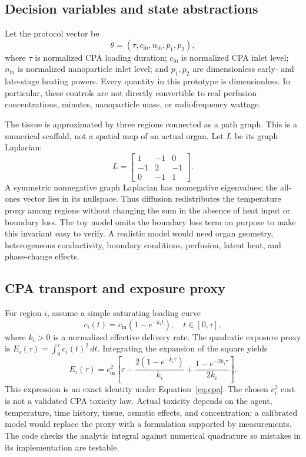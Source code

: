 \documentclass[11pt]{article}
\begin{document}
\subsection{Decision variables and state abstractions}
Let the protocol vector be
\begin{equation}
\theta=(\tau,c_{\mathrm{in}},n_{\mathrm{in}},p_1,p_2),
\label{eq:theta}
\end{equation}
where $\tau$ is normalized CPA loading duration; $c_{\mathrm{in}}$ is normalized CPA inlet level; $n_{\mathrm{in}}$ is normalized nanoparticle inlet level; and $p_1,p_2$ are dimensionless early- and late-stage heating powers. Every quantity in this prototype is dimensionless. In particular, these controls are not directly convertible to real perfusion concentrations, minutes, nanoparticle mass, or radiofrequency wattage.

The tissue is approximated by three regions connected as a path graph. This is a numerical scaffold, not a spatial map of an actual organ. Let $L$ be its graph Laplacian:
\begin{equation}
L=\begin{bmatrix}1&-1&0\\-1&2&-1\\0&-1&1\end{bmatrix}.
\label{eq:laplacian}
\end{equation}
A symmetric nonnegative graph Laplacian has nonnegative eigenvalues; the all-ones vector lies in its nullspace. Thus diffusion redistributes the temperature proxy among regions without changing the sum in the absence of heat input or boundary loss. The toy model omits the boundary loss term on purpose to make this invariant easy to verify. A realistic model would need organ geometry, heterogeneous conductivity, boundary conditions, perfusion, latent heat, and phase-change effects.

\subsection{CPA transport and exposure proxy}
For region $i$, assume a simple saturating loading curve
\begin{equation}
c_i(t)=c_{\mathrm{in}}\left(1-e^{-k_i t}\right),\quad t\in[0,\tau],
\label{eq:cpa}
\end{equation}
where $k_i>0$ is a normalized effective delivery rate. The quadratic exposure proxy is $E_i(\tau)=\int_0^\tau c_i(t)^2\,dt$. Integrating the expansion of the square yields
\begin{equation}
E_i(\tau)=c_{\mathrm{in}}^2\left[\tau-\frac{2(1-e^{-k_i\tau})}{k_i}+\frac{1-e^{-2k_i\tau}}{2k_i}\right].
\label{eq:exposure}
\end{equation}
This expression is an exact identity under Equation~\ref{eq:cpa}. The chosen $c_i^2$ cost is not a validated CPA toxicity law. Actual toxicity depends on the agent, temperature, time history, tissue, osmotic effects, and concentration; a calibrated model would replace the proxy with a formulation supported by measurements. The code checks the analytic integral against numerical quadrature so mistakes in its implementation are testable.
\end{document}
